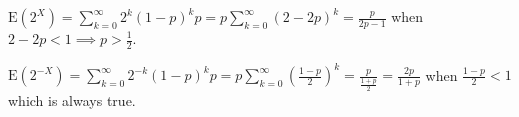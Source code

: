 $\text{E}(2^{X}) = \sum_{k=0}^{\infty}2^{k}(1-p)^{k}p = p\sum_{k=0}^{\infty}
(2-2p)^{k} = \frac{p}{2p-1}$ when $2-2p < 1 \implies p > \frac{1}{2}$.

$\text{E}(2^{-X}) = \sum_{k=0}^{\infty}2^{-k}(1-p)^{k}p = p\sum_{k=0}^
{\infty}(\frac{1-p}{2})^{k} = \frac{p}{\frac{1+p}{2}} = \frac{2p}{1+p}$ when $
\frac{1-p}{2} < 1$ which is always true.